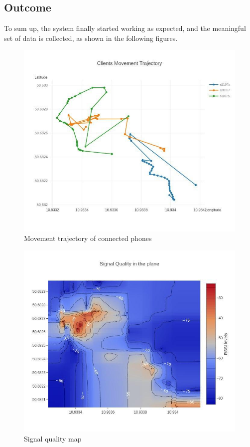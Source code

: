 \hypertarget{outcome}{%
\subsection{Outcome}\label{outcome}}

To sum up, the system finally started working as expected, and the meaningful set of data is collected, as shown in the following figures.

\begin{figure}[H]
	\centering
	\includegraphics[width=\linewidth,keepaspectratio]{images/experiment_3_1.jpg}
\caption{Movement trajectory of connected phones}
\end{figure}

\begin{figure}[H]
	\centering
	\includegraphics[width=\linewidth,keepaspectratio]{images/experiment_3_2.jpg}
\caption{Signal quality map}
\end{figure}

